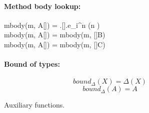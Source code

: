 \begin{figure}[H]
{\begin{minipage}{\linewidth-0.5cm}
			\paragraph{Method body lookup:}
				\begin{mathpar}
						{mbody(m, A[]) = .[].e_i^n (n \in {})} \\

						{mbody(m, A[]) = mbody(m, []B)}\\

						{mbody(m, A[]) = mbody(m, []C)}\\
				\end{mathpar}

			\paragraph{Bound of types:}
					\[bound_\Delta(X) = \Delta(X) \]
					\[bound_\Delta(A) = A \]
    \end{minipage}
  }
	\caption{Auxiliary functions.}
	\label{fig:auxFunctions}
\end{figure}

